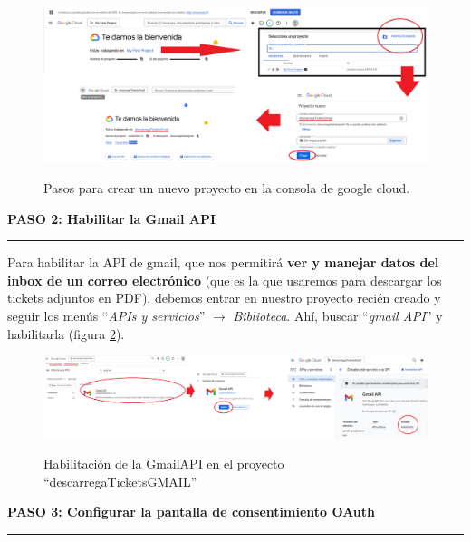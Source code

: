 \documentclass[a4paper,12pt]{report}
\begin{document}
	\FloatBarrier
	\setlength{\belowcaptionskip}{3pt}
	\begin{figure}[H]
		\centering
		\caption{Pasos para crear un nuevo proyecto en la consola de google cloud.}
		\includegraphics[width=1\linewidth]{img/googleCloudA.png}
		\label{fig:googleCloudA}
	\end{figure}
	\FloatBarrier
	
	
	
	
	
	
	
	
	
	
	
	
	
	\noindent \textbf{PASO 2: Habilitar la Gmail API}
	\vspace{.2em}
	\hrule
	\vspace{.5em}
	
	Para habilitar la API de gmail, que nos permitirá \textbf{ver y manejar datos del inbox de un correo electrónico} (que es la que usaremos para descargar los tickets adjuntos en PDF), debemos entrar en nuestro proyecto recién creado y seguir los menús ``\textit{APIs y servicios}'' $\rightarrow$ \textit{Biblioteca}. Ahí, buscar ``\textit{gmail API}'' y habilitarla (figura \ref{fig:googleCloudC}).
	
	\FloatBarrier
	\setlength{\belowcaptionskip}{3pt}
	\begin{figure}[H]
		\centering
		\caption{Habilitación de la GmailAPI en el proyecto ``descarregaTicketsGMAIL''}
		\includegraphics[width=1\linewidth]{img/googleCloudC.png}
		\label{fig:googleCloudC}
	\end{figure}
	\FloatBarrier
	
	\noindent \textbf{PASO 3: Configurar la pantalla de consentimiento OAuth}
	\vspace{.1em}
	\hrule
	\vspace{.5em}
	
\end{document}
